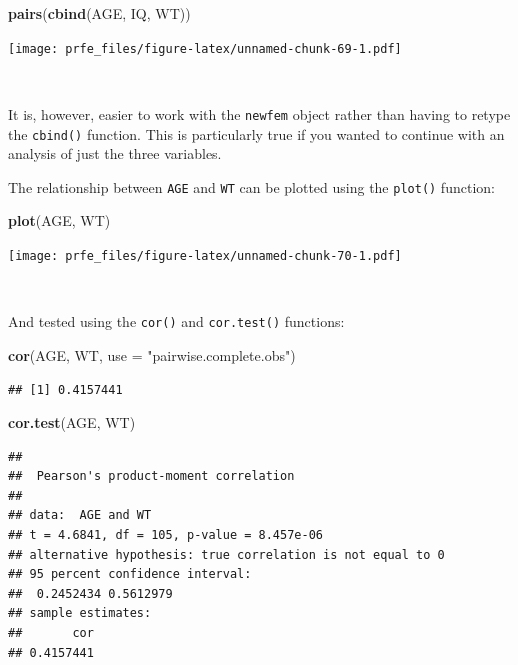 \documentclass[12pt,a4paper]{book}
\newenvironment{Shaded}{\begin{snugshade}}{\end{snugshade}}
\newcommand{\KeywordTok}[1]{\textcolor[rgb]{0.13,0.29,0.53}{\textbf{#1}}}
\newcommand{\DataTypeTok}[1]{\textcolor[rgb]{0.13,0.29,0.53}{#1}}
\newcommand{\StringTok}[1]{\textcolor[rgb]{0.31,0.60,0.02}{#1}}
\newcommand{\NormalTok}[1]{#1}
\theoremstyle{definition}
\theoremstyle{definition}
\theoremstyle{definition}
\theoremstyle{remark}
\begin{document}
\begin{Shaded}
\begin{Highlighting}[]
\KeywordTok{pairs}\NormalTok{(}\KeywordTok{cbind}\NormalTok{(AGE, IQ, WT))}
\end{Highlighting}
\end{Shaded}

\texttt{[image: prfe\_files/figure-latex/unnamed-chunk-69-1.pdf]}

~

It is, however, easier to work with the \texttt{newfem} object rather
than having to retype the \texttt{cbind()} function. This is
particularly true if you wanted to continue with an analysis of just the
three variables.

The relationship between \texttt{AGE} and \texttt{WT} can be plotted
using the \texttt{plot()} function:

\begin{Shaded}
\begin{Highlighting}[]
\KeywordTok{plot}\NormalTok{(AGE, WT)}
\end{Highlighting}
\end{Shaded}

\texttt{[image: prfe\_files/figure-latex/unnamed-chunk-70-1.pdf]}

~

And tested using the \texttt{cor()} and \texttt{cor.test()} functions:

\begin{Shaded}
\begin{Highlighting}[]
\KeywordTok{cor}\NormalTok{(AGE, WT, }\DataTypeTok{use =} \StringTok{"pairwise.complete.obs"}\NormalTok{)}
\end{Highlighting}
\end{Shaded}

\begin{verbatim}
## [1] 0.4157441
\end{verbatim}

\begin{Shaded}
\begin{Highlighting}[]
\KeywordTok{cor.test}\NormalTok{(AGE, WT)}
\end{Highlighting}
\end{Shaded}

\begin{verbatim}
## 
##  Pearson's product-moment correlation
## 
## data:  AGE and WT
## t = 4.6841, df = 105, p-value = 8.457e-06
## alternative hypothesis: true correlation is not equal to 0
## 95 percent confidence interval:
##  0.2452434 0.5612979
## sample estimates:
##       cor 
## 0.4157441
\end{verbatim}
\end{document}
